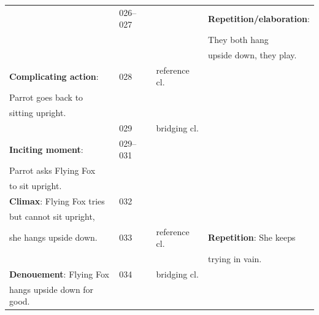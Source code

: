 \documentclass[output=paper]{LSP/langsci}
\begin{document}
\begin{table}[]
\begin{tabular}{llll}
                                           & 026--027          &                 & \textbf{Repetition/elaboration}:       \\
                                       &                   &                 & They both hang                      \\
                                           &                   &                 & upside down, they play.                      \\                                   
\textbf{Complicating action}:                & 028               &  reference cl.               &                                              \\
Parrot goes back to                  &                   &                 &                                              \\
sitting upright.                       &                   &                 &                                              \\
                                      & 029               & bridging cl. &                                              \\
\textbf{Inciting moment}:                       & 029--031          &                 &                                              \\
Parrot asks Flying Fox                   &                   &                 &                                              \\
to sit upright.                         &                   &                 &                                              \\
\textbf{Climax}: Flying Fox tries                  & 032               &                 &                                              \\
but cannot sit upright,                 &                   &                 &                                              \\
she hangs upside down.                  & 033               &   reference cl.              & \textbf{Repetition}: She keeps         \\
                                            &              &                 &  trying in vain.        \\
\textbf{Denouement}: Flying Fox                   & 034               & bridging cl. &                                              \\
hangs upside down for good.                   &                   &                 &                                              \\

\end{tabular}
\end{table}
\end{document}
